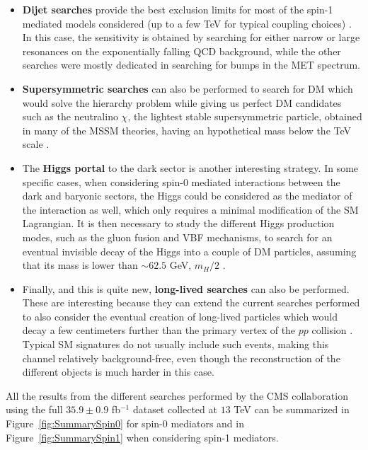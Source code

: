 \documentclass[a4paper, 10pt, openright]{report}
\begin{document}
\begin{itemize}
\item \textbf{Dijet searches} provide the best exclusion limits for most of the spin-1 mediated models considered (up to a few TeV for typical coupling choices) \cite{DijetAtlas, DijetCMS}. In this case, the sensitivity is obtained by searching for either narrow or large resonances on the exponentially falling QCD background, while the other searches were mostly dedicated in searching for bumps in the \ac{MET} spectrum.
\item \textbf{Supersymmetric searches} can also be performed to search for \ac{DM} which would solve the hierarchy problem while giving us perfect \ac{DM} candidates such as the neutralino $\chi$, the lightest stable supersymmetric particle, obtained in many of the \ac{MSSM} theories, having an hypothetical mass below the TeV scale \cite{SUSYDM}.
\item The \textbf{Higgs portal} to the dark sector is another interesting strategy. In some specific cases, when considering spin-0 mediated interactions between the dark and baryonic sectors, the Higgs could be considered as the mediator of the interaction as well, which only requires a minimal modification of the \ac{SM} Lagrangian. It is then necessary to study the different Higgs production modes, such as the gluon fusion and \ac{VBF} mechanisms, to search for an eventual invisible decay of the Higgs into a couple of \ac{DM} particles, assuming that its mass is lower than $\sim 62.5$ GeV, $m_H/2$ \cite{InvisibleHiggs}.
\item Finally, and this is quite new, \textbf{long-lived searches} can also be performed. These are interesting because they can extend the current searches performed to also consider the eventual creation of long-lived particles which would decay a few centimeters further than the primary vertex of the $pp$ collision \cite{LLSearches}. Typical \ac{SM} signatures do not usually include such events, making this channel relatively background-free, even though the reconstruction of the different objects is much harder in this case.
\end{itemize}

All the results from the different searches performed by the \ac{CMS} collaboration using the full $35.9 \pm 0.9$ fb$^{-1}$ dataset collected at $13$ TeV can be summarized in Figure~\ref{fig:SummarySpin0} for spin-0 mediators and in Figure~\ref{fig:SummarySpin1} when considering spin-1 mediators.
\end{document}
